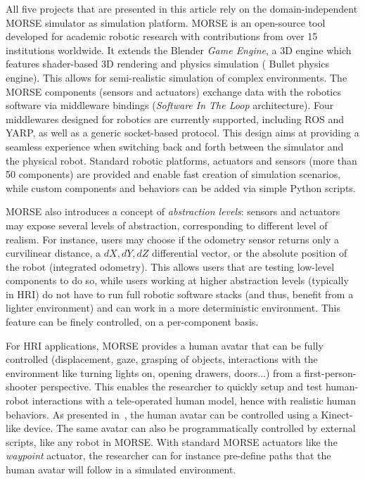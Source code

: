 \documentclass{llncs}
\begin{document}
All five projects that are presented in this article rely on the
domain-independent MORSE simulator as simulation platform. MORSE is an
open-source tool developed for academic robotic research with contributions from
over 15 institutions worldwide. It extends the Blender \emph{Game Engine}, a 3D
engine which features shader-based 3D rendering and physics simulation ({\sc
Bullet} physics engine). This allows for semi-realistic simulation of complex
environments. The MORSE components (sensors and actuators) exchange data with
the robotics software via middleware bindings (\emph{Software In The Loop}
architecture).  Four middlewares designed for robotics are currently supported,
including ROS and YARP, as well as a generic socket-based protocol. This design
aims at providing a seamless experience when switching back and forth between
the simulator and the physical robot. Standard robotic platforms, actuators and
sensors (more than 50 components) are provided and enable fast creation of
simulation scenarios, while custom components and behaviors can be added via
simple Python scripts.


MORSE also introduces a concept of \emph{abstraction levels}: sensors and actuators
may expose several levels of abstraction, corresponding to different level of
realism. For instance, users may choose if the odometry sensor returns only a
curvilinear distance, a $dX, dY, dZ$ differential vector, or the absolute
position of the robot (integrated odometry). This allows users that are testing
low-level components to do so, while users working at higher abstraction
levels (typically in HRI) do not have to run full robotic software stacks (and
thus, benefit from a lighter environment) and can work in a more deterministic
environment. This feature can be finely controlled, on a per-component basis.

For HRI applications, MORSE provides a human avatar that can be fully controlled
(displacement, gaze, grasping of objects, interactions with the environment like
turning lights on, opening drawers, doors...) from a first-person-shooter perspective.
This enables the researcher to quickly setup and test human-robot interactions
with a tele-operated human model, hence with realistic human behaviors. As
presented in~\cite{lemaignan2012morse}, the human avatar can be controlled using
a Kinect-like device. The same avatar can also be programmatically controlled
by external scripts, like any robot in MORSE. With standard MORSE actuators like
the \emph{waypoint} actuator, the researcher can for instance pre-define paths
that the human avatar will follow in a simulated environment.
\end{document}

